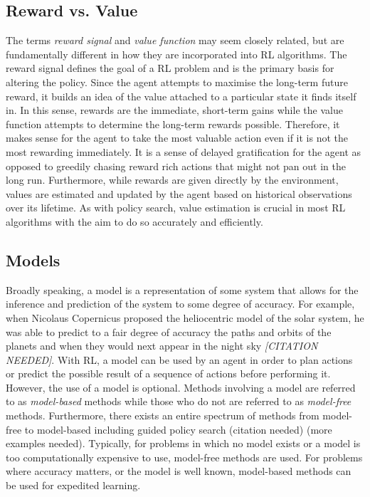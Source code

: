\documentclass[12pt,notitlepage]{article}
\begin{document}
%    

\subsection{Reward vs. Value}

The terms \emph{reward signal} and \emph{value function} may seem closely
related, but are fundamentally different in how they are incorporated into RL
algorithms. The reward signal defines the goal of a RL problem and is the
primary basis for altering the policy. Since the agent attempts to maximise the
long-term future reward, it builds an idea of the value attached to a
particular state it finds itself in. In this sense, rewards are the immediate,
short-term gains while the value function attempts to determine the long-term
rewards possible. Therefore, it makes sense for the agent to take the most
valuable action even if it is not the most rewarding immediately. It is a sense
of delayed gratification for the agent as opposed to greedily chasing reward
rich actions that might not pan out in the long run. Furthermore, while rewards
are given directly by the environment, values are estimated and updated by the
agent based on historical observations over its lifetime. As with policy
search, value estimation is crucial in most RL algorithms with the aim to do so
accurately and efficiently.

\subsection{Models}

Broadly speaking, a model is a representation of some system that allows for
the inference and prediction of the system to some degree of accuracy. For
example, when Nicolaus Copernicus proposed the heliocentric model of the solar
system, he was able to predict to a fair degree of accuracy the paths and
orbits of the planets and when they would next appear in the night sky
\emph{[CITATION NEEDED]}. With RL, a model can be used by an agent in order to
plan actions or predict the possible result of a sequence of actions before
performing it. However, the use of a model is optional. Methods involving a
model are referred to as \emph{model-based} methods while those who do not are
referred to as \emph{model-free} methods. Furthermore, there exists an entire
spectrum of methods from model-free to model-based including guided policy
search (citation needed) (more examples needed). Typically, for problems in
which no model exists or a model is too computationally expensive to use,
model-free methods are used. For problems where accuracy matters, or the model
is well known, model-based methods can be used for expedited learning.




\appendix

%
%

\glsaddall

\printglossary[nonumberlist]
\end{document}
